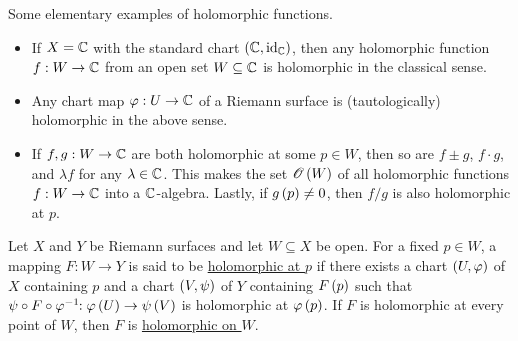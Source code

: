 \documentclass[../Moduli_Spaces_of_Riemann_Surfaces.tex]{subfiles}
\begin{document}
    \begin{example}\label{RS:exa:elementary_holomorphic_functions}
        Some elementary examples of holomorphic functions.
        \begin{itemize}
            \item If $X=\mathbb{C}$ with the standard chart $\left(\mathbb{C},\operatorname{id}_{\mathbb{C}}\right)$, then any holomorphic function $f:W\to\mathbb{C}$ from an open set $W\subseteq\mathbb{C}$ is holomorphic in the classical sense.
                \vspace{-0.05in}
            \item Any chart map $\varphi:U\to\mathbb{C}$ of a Riemann surface is (tautologically) holomorphic in the above sense.
                \vspace{-0.05in}
            \item If $f,g:W\to\mathbb{C}$ are both holomorphic at some $p\in W$, then so are $f\pm g$, $f\cdot g$, and $\lambda f$ for any $\lambda\in\mathbb{C}$. This makes the set $\mathscr{O}\left(W\right)$ of all holomorphic functions $f:W\to\mathbb{C}$ into a $\mathbb{C}$-algebra. Lastly, if $g\left(p\right)\neq0$, then $f/g$ is also holomorphic at $p$.\exqed
        \end{itemize}
    \end{example}
    \begin{definition}
        Let $X$ and $Y$ be Riemann surfaces and let $W\subseteq X$ be open. For a fixed $p\in W$, a mapping $F:W\to Y$ is said to be \ul{holomorphic at $p$} if there exists a chart $\left(U,\varphi\right)$ of $X$ containing $p$ and a chart $\left(V,\psi\right)$ of $Y$ containing $F\left(p\right)$ such that $\psi\circ F\circ\varphi^{-1}\!\!:\varphi\left(U\right)\to\psi\left(V\right)$ is holomorphic at $\varphi\left(p\right)$. If $F$ is holomorphic at every point of $W$, then $F$ is \ul{holomorphic on $W$}.
    \end{definition}
\end{document}
